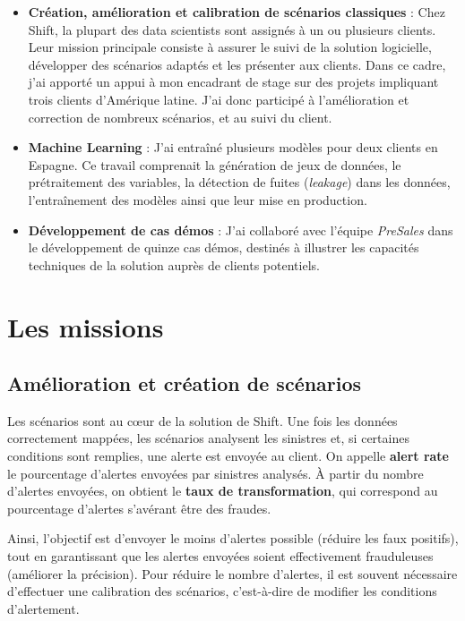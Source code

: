 \documentclass [twoside,openright,a4paper,11pt,french] {report}
\begin{document}
\begin{itemize}
    \item \textbf{Création, amélioration et calibration de scénarios classiques} : Chez Shift, la plupart
     des data scientists sont assignés à un ou plusieurs clients. Leur mission principale consiste à assurer
      le suivi de la solution logicielle, développer des scénarios adaptés et les présenter aux clients.
       Dans ce cadre, j’ai apporté un appui à mon encadrant de stage sur des projets impliquant trois clients d’Amérique latine.
       J'ai donc participé à l'amélioration et correction de nombreux scénarios, et au suivi du client.
    
    \item \textbf{Machine Learning} : J’ai entraîné plusieurs modèles pour deux clients en Espagne. Ce travail comprenait 
    la génération de jeux de données, le prétraitement des variables, 
    la détection de fuites (\textit{leakage}) dans les données, l’entraînement des modèles ainsi que leur mise en production.
    
    \item \textbf{Développement de cas démos} : J’ai collaboré avec l’équipe \textit{PreSales} dans le développement
     de quinze cas démos, destinés à illustrer les capacités techniques de la solution auprès de clients potentiels.
\end{itemize}



\chapter{Les missions}
\label {chap:contexte}
\section{Amélioration et création de scénarios}

Les scénarios sont au cœur de la solution de Shift. Une fois les données correctement 
mappées, les scénarios analysent les sinistres et, si certaines conditions sont 
remplies, une alerte est envoyée au client. On appelle \textbf{alert rate} le 
pourcentage d'alertes envoyées par sinistres analysés. À partir du nombre d'alertes 
envoyées, on obtient le \textbf{taux de transformation}, qui correspond au 
pourcentage d'alertes s'avérant être des fraudes.

Ainsi, l'objectif est d'envoyer le moins d'alertes possible (réduire les faux 
positifs), tout en garantissant que les alertes envoyées soient effectivement 
frauduleuses (améliorer la précision). Pour réduire le nombre d'alertes, il est 
souvent nécessaire d'effectuer une calibration des scénarios, c'est-à-dire de modifier 
les conditions d'alertement.
\end{document}

